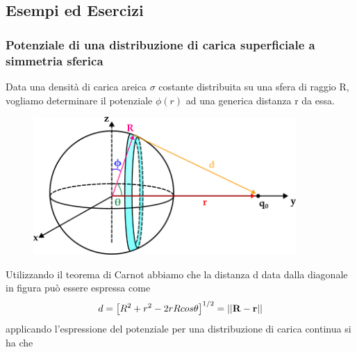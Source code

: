 \subsection{Esempi ed Esercizi}

\subsubsection{Potenziale di una distribuzione di carica superficiale a simmetria sferica}

Data una densit\`a di carica areica $\sigma$ costante distribuita su una sfera di raggio R, vogliamo determinare il potenziale $\phi(r)$ ad una generica distanza r da essa.

\newpage

\begin{figure}[!ht]
\vspace{0.1in}
\includegraphics[width =10cm]{images/ringsym}	
\centering
\vspace{0.2in}
\end{figure}
Utilizzando il teorema di Carnot abbiamo che la distanza d data dalla diagonale in figura pu\`o essere espressa come 
\begin{equation*}
	d = \left [ R^2+r^2 -2rRcos\theta \right ]^{1/2} = ||\bold{R} -\bold{r}||
\end{equation*}
applicando l'espressione del potenziale per una distribuzione di carica continua si ha che 

